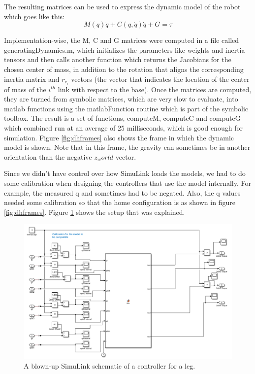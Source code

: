 The resulting matrices can be used to express the dynamic model of the robot which goes like this:
$$
    M(q) \ddot{q} + C(q, \dot{q}) \dot{q} + G = \tau
$$

Implementation-wise, the M, C and G matrices were computed in a file called generatingDynamics.m, which initializes the parameters like weights and inertia tensors and then calls another function which returns the Jacobians for the chosen center of mass, in addition to the rotation that aligns the corresponding inertia matrix and $r_{c_i}$ vectors (the vector that indicates the location of the center of mass of the $i^{th}$ link with respect to the base). Once the matrices are computed, they are turned from symbolic matrices, which are very slow to evaluate, into matlab functions using the matlabFunction routine which is part of the symbolic toolbox. The result is a set of functions, computeM, computeC and computeG which combined run at an average of 25 milliseconds, which is good enough for simulation. Figure \ref{fig:dhframes} also shows the frame in which the dynamic model is shown. Note that in this frame, the gravity can sometimes be in another orientation than the negative $z_world$ vector.

Since we didn't have control over how SimuLink loads the models, we had to do some calibration when designing the controllers that use the model internally. For example, the measured q and  sometimes had to be negated. Also, the q values needed some calibration so that the home configuration is as shown in figure \ref{fig:dhframes}. Figure \ref{fig:calibration} shows the setup that was explained.

\begin{figure}[thpb]
    \parbox{\linewidth}{\includegraphics[width=\linewidth]{Figures/controller_calibration.png}}
    \caption{A blown-up SimuLink schematic of a controller for a leg.}
    \label{fig:calibration}
\end{figure}